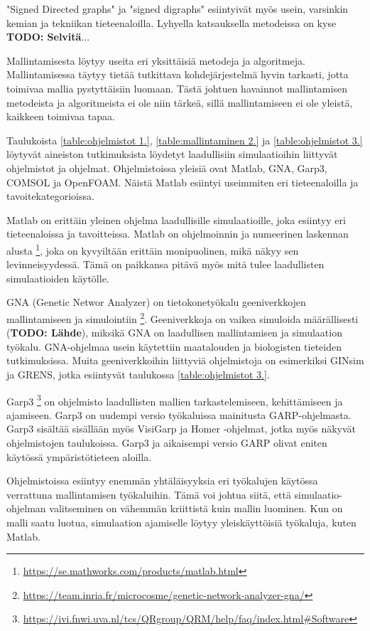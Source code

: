 \documentclass[utf8]{gradu3}
\begin{document}
"Signed Directed graphs" ja "signed digraphs" esiintyivät myös usein, 
varsinkin kemian ja tekniikan tieteenaloilla. Lyhyella katsauksella
metodeissa on kyse \textbf{TODO: Selvitä}...

Mallintamisesta löytyy useita eri yksittäisiä metodeja ja algoritmeja. 
Mallintamisessa täytyy tietää tutkittava kohdejärjestelmä hyvin tarkasti, 
jotta toimivaa mallia pystyttäisiin luomaan. Tästä johtuen havainnot 
mallintamisen metodeista ja algoritmeista ei ole niin tärkeä, sillä
mallintamiseen ei ole yleistä, kaikkeen toimivaa tapaa.

Taulukoista \ref{table:ohjelmistot 1.}, \ref{table:mallintaminen 2.} ja 
\ref{table:ohjelmistot 3.} löytyvät aineiston tutkimuksista löydetyt 
laadullisiin simulaatioihin liittyvät ohjelmistot ja ohjelmat.
Ohjelmistoissa yleisiä ovat Matlab, GNA, Garp3, COMSOL ja OpenFOAM. 
Näistä Matlab esiintyi useimmiten eri tieteenaloilla ja tavoitekategorioissa.

Matlab on erittäin yleinen ohjelma laadullisille simulaatioille, joka esiintyy eri 
tieteenaloissa ja tavoitteissa. Matlab on ohjelmoinnin ja numeerinen laskennan alusta
\footnote{\url{https://se.mathworks.com/products/matlab.html}},
joka on kyvyiltään erittäin monipuolinen, mikä näkyy sen levinneisyydessä. 
Tämä on paikkansa pitävä myös mitä tulee laadullisten simulaatioiden käytölle.

GNA (Genetic Networ Analyzer) on tietokonetyökalu geeniverkkojen mallintamiseen 
ja simulointiin 
\footnote{\url{https://team.inria.fr/microcosme/genetic-network-analyzer-gna/}}. 
Geeniverkkoja on vaikea simuloida määrällisesti (\textbf{TODO: Lähde}), miksikä
GNA on laadullisen mallintamisen ja simulaation työkalu. GNA-ohjelmaa 
usein käytettiin maatalouden ja biologisten tieteiden tutkimuksissa.
Muita geeniverkkoihin liittyviä ohjelmistoja on esimerkiksi GINsim ja GRENS,
jotka esiintyvät taulukossa \ref{table:ohjelmistot 3.}.

Garp3 
\footnote{\url{https://ivi.fnwi.uva.nl/tcs/QRgroup/QRM/help/faq/index.html\#Software}} on ohjelmisto laadullisten mallien tarkastelemiseen, kehittämiseen ja 
ajamiseen. Garp3 on uudempi versio työkaluissa mainitusta GARP-ohjelmasta.
Garp3 sisältää sisällään myös VisiGarp ja Homer -ohjelmat, jotka myös näkyvät 
ohjelmistojen taulukoissa. Garp3 ja aikaisempi versio GARP olivat eniten käytössä
ympäristötieteen aloilla.

Ohjelmistoissa esiintyy enemmän yhtäläisyyksia eri työkalujen käytössa verrattuna
mallintamisen työkaluihin. Tämä voi johtua siitä, että simulaatio-ohjelman
valitseminen on vähemmän kriittistä kuin mallin luominen. 
Kun on malli saatu luotua, simulaation ajamiselle löytyy yleiskäyttöisiä 
työkaluja, kuten Matlab.
\end{document}
